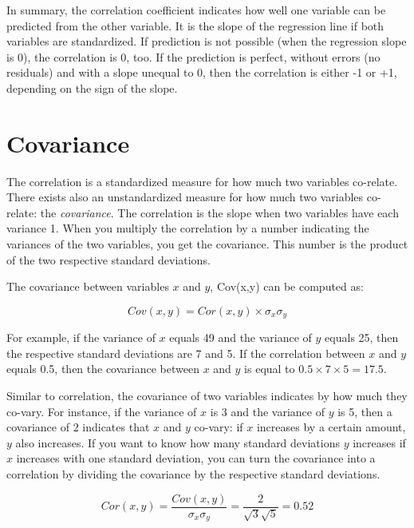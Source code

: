 \documentclass[]{book}\usepackage[]{graphicx}\usepackage[]{color}
\begin{document}
In summary, the correlation coefficient indicates how well one variable can be predicted from the other variable. It is the slope of the regression line if both variables are standardized. If prediction is not possible (when the regression slope is 0), the correlation is 0, too. If the prediction is perfect, without errors (no residuals) and with a slope unequal to 0, then the correlation is either -1 or +1, depending on the sign of the slope.

\section{Covariance}

The correlation is a standardized measure for how much two variables co-relate. There exists also an unstandardized measure for how much two variables co-relate: the \textit{covariance}. The correlation is the slope when two variables have each variance 1. When you multiply the correlation by a number indicating the variances of the two variables, you get the covariance. This number is the product of the two respective standard deviations.

The covariance between variables $x$ and $y$, Cov(x,y) can be computed as:


\begin{equation}
Cov(x,y)= Cor(x,y) \times \sigma_x \sigma_y
\end{equation}

For example, if the variance of $x$ equals 49 and the variance of $y$ equals 25, then the respective standard deviations are 7 and 5. If the correlation between $x$ and $y$ equals 0.5, then the covariance between $x$ and $y$ is equal to $0.5 \times 7 \times 5 = 17.5$.

Similar to correlation, the covariance of two variables indicates by how much they co-vary. For instance, if the variance of $x$ is 3 and the variance of $y$ is 5, then a covariance of 2 indicates that $x$ and $y$ co-vary: if $x$ increases by a certain amount, $y$ also increases. If you want to know how many standard deviations $y$ increases if $x$ increases with one standard deviation, you can turn the covariance into a correlation by dividing the covariance by the respective standard deviations.

\begin{equation}
Cor(x,y)= \frac{Cov(x,y)} { \sigma_x \sigma_y}= \frac{2} { \sqrt{3} \sqrt{5}}=0.52
\end{equation}
\end{document}
